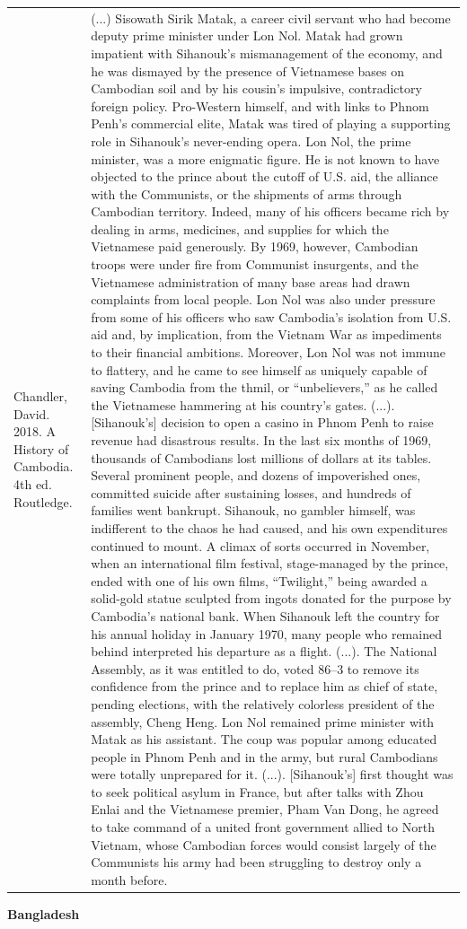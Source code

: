 {\begin{longtable}{p{}p{}}
\\
Chandler, David. 2018. A History of Cambodia. 4th ed. Routledge. & (...) Sisowath Sirik Matak, a career civil servant who had become deputy prime minister under Lon Nol. Matak had grown impatient with Sihanouk's mismanagement of the economy, and he was dismayed by the presence of Vietnamese bases on Cambodian soil and by his cousin's impulsive, contradictory foreign policy. Pro-Western himself, and with links to Phnom Penh's commercial elite, Matak was tired of playing a supporting role in Sihanouk's never-ending opera. Lon Nol, the prime minister, was a more enigmatic figure. He is not known to have objected to the prince about the cutoff of U.S. aid, the alliance with the Communists, or the shipments of arms through Cambodian territory. Indeed, many of his officers became rich by dealing in arms, medicines, and supplies for which the Vietnamese paid generously. By 1969, however, Cambodian troops were under fire from Communist insurgents, and the Vietnamese administration of many base areas had drawn complaints from local people. Lon Nol was also under pressure from some of his officers who saw Cambodia's isolation from U.S. aid and, by implication, from the Vietnam War as impediments to their financial ambitions. Moreover, Lon Nol was not immune to flattery, and he came to see himself as uniquely capable of saving Cambodia from the thmil, or “unbelievers,” as he called the Vietnamese hammering at his country's gates. (...). [Sihanouk's] decision to open a casino in Phnom Penh to raise revenue had disastrous results. In the last six months of 1969, thousands of Cambodians lost millions of dollars at its tables. Several prominent people, and dozens of impoverished ones, committed suicide after sustaining losses, and hundreds of families went bankrupt. Sihanouk, no gambler himself, was indifferent to the chaos he had caused, and his own expenditures continued to mount. A climax of sorts occurred in November, when an international film festival, stage-managed by the prince, ended with one of his own films, “Twilight,” being awarded a solid-gold statue sculpted from ingots donated for the purpose by Cambodia's national bank. When Sihanouk left the country for his annual holiday in January 1970, many people who remained behind interpreted his departure as a flight. (...). The National Assembly, as it was entitled to do, voted 86–3 to remove its confidence from the prince and to replace him as chief of state, pending elections, with the relatively colorless president of the assembly, Cheng Heng. Lon Nol remained prime minister with Matak as his assistant. The coup was popular among educated people in Phnom Penh and in the army, but rural Cambodians were totally unprepared for it. (...). [Sihanouk's] first thought was to seek political asylum in France, but after talks with Zhou Enlai and the Vietnamese premier, Pham Van Dong, he agreed to take command of a united front government allied to North Vietnam, whose Cambodian forces would consist largely of the Communists his army had been struggling to destroy only a month before.
\\
\end{longtable}}
\clearpage
         \textbf{Bangladesh} 

